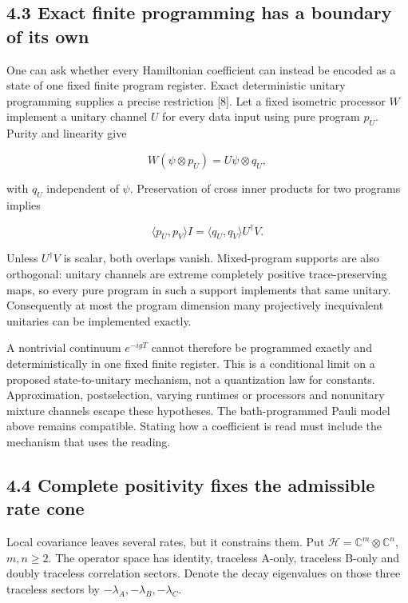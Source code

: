 \documentclass[
  11pt,
  a4paper,
]{article}
\begin{document}
\subsection{4.3 Exact finite programming has a boundary of its own}\label{exact-finite-programming-has-a-boundary-of-its-own}

One can ask whether every Hamiltonian coefficient can instead be encoded as a state of one fixed finite program register. Exact deterministic unitary programming supplies a precise restriction {[}8{]}. Let a fixed isometric processor \(W\) implement a unitary channel \(U\) for every data input using pure program \(p_U\). Purity and linearity give

\[W(\psi\otimes p_U)=U\psi\otimes q_U,\]

with \(q_U\) independent of \(\psi\). Preservation of cross inner products for two programs implies

\[\langle p_U,p_V\rangle I=\langle q_U,q_V\rangle U^\dagger V.\]

Unless \(U^\dagger V\) is scalar, both overlaps vanish. Mixed-program supports are also orthogonal: unitary channels are extreme completely positive trace-preserving maps, so every pure program in such a support implements that same unitary. Consequently at most the program dimension many projectively inequivalent unitaries can be implemented exactly.

A nontrivial continuum \(e^{-igT}\) cannot therefore be programmed exactly and deterministically in one fixed finite register. This is a conditional limit on a proposed state-to-unitary mechanism, not a quantization law for constants. Approximation, postselection, varying runtimes or processors and nonunitary mixture channels escape these hypotheses. The bath-programmed Pauli model above remains compatible. Stating how a coefficient is read must include the mechanism that uses the reading.

\subsection{4.4 Complete positivity fixes the admissible rate cone}\label{complete-positivity-fixes-the-admissible-rate-cone}

Local covariance leaves several rates, but it constrains them. Put \(\mathcal H=\mathbb C^m\otimes\mathbb C^n\), \(m,n\ge2\). The operator space has identity, traceless A-only, traceless B-only and doubly traceless correlation sectors. Denote the decay eigenvalues on those three traceless sectors by \(-\lambda_A,-\lambda_B,-\lambda_C\).
\end{document}
